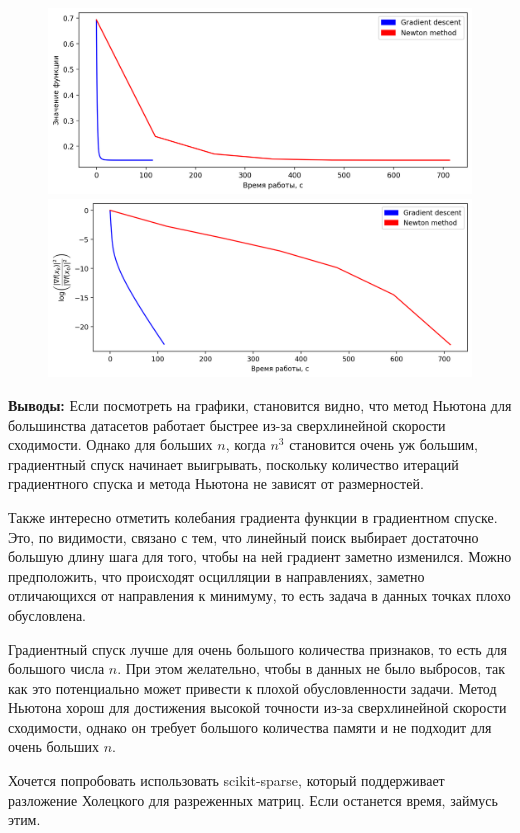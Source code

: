 \documentclass[notitlepage]{article}
\begin{document}
\begin{figure}[ht]
\begin{minipage}[t]{.5\textwidth}
  \centering
  \includegraphics[width=\textwidth, keepaspectratio]{plots/real-sim.bz2_plot_func.png}
\end{minipage}
\begin{minipage}[t]{.5\textwidth}
  \centering
  \includegraphics[width=\textwidth, keepaspectratio]{plots/real-sim.bz2_plot_grad.png}
\end{minipage}
\end{figure}

\large\textbf{Выводы:}
Если посмотреть на графики, становится видно, что метод Ньютона для большинства датасетов работает быстрее из-за сверхлинейной
скорости сходимости.
Однако для больших $n$, когда $n^3$ становится очень уж большим, градиентный спуск начинает выигрывать, поскольку
количество итераций градиентного спуска и метода Ньютона не зависят от размерностей.

Также интересно отметить колебания градиента функции в градиентном спуске.
Это, по видимости, связано с тем, что линейный поиск выбирает
достаточно большую длину шага для того, чтобы на ней градиент заметно изменился.
Можно предположить, что происходят осцилляции в направлениях, заметно отличающихся от направления к минимуму, то есть задача в данных точках плохо обусловлена.

Градиентный спуск лучше для очень большого количества признаков, то есть для большого числа $n$.
При этом желательно, чтобы в данных не было выбросов, так как это потенциально может привести к плохой обусловленности задачи.
Метод Ньютона хорош для достижения высокой точности из-за сверхлинейной скорости сходимости, однако он требует 
большого количества памяти и не подходит для очень больших $n$.

Хочется попробовать использовать scikit-sparse, который поддерживает разложение Холецкого для разреженных матриц. Если останется время,
займусь этим.
			
			
\end{document}

